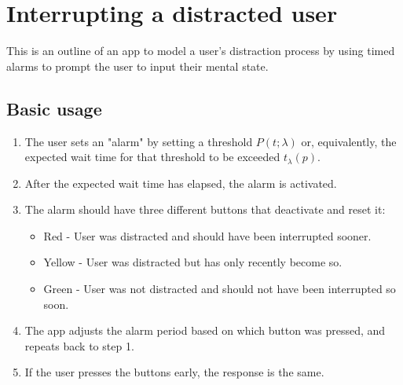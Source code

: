 \documentclass{article}
\begin{document}
\section{Interrupting a distracted user}
This is an outline of an app to model a user's distraction process by using timed alarms to prompt the user to input their mental state.
\subsection{Basic usage}
\begin{enumerate}
\item The user sets an "alarm" by setting a threshold $P(t;\lambda)$ or, equivalently, the expected wait time for that threshold to be exceeded $t_\lambda(p)$.
\item After the expected wait time has elapsed, the alarm is activated.
\item The alarm should have three different buttons that deactivate and reset it:
\begin{itemize}
\item Red - User was distracted and should have been interrupted sooner.
\item Yellow - User was distracted but has only recently become so.
\item Green - User was not distracted and should not have been interrupted so soon.
\end{itemize}
\item The app adjusts the alarm period based on which button was pressed, and repeats back to step 1.
\item If the user presses the buttons early, the response is the same.
\end{enumerate}
\end{document}
